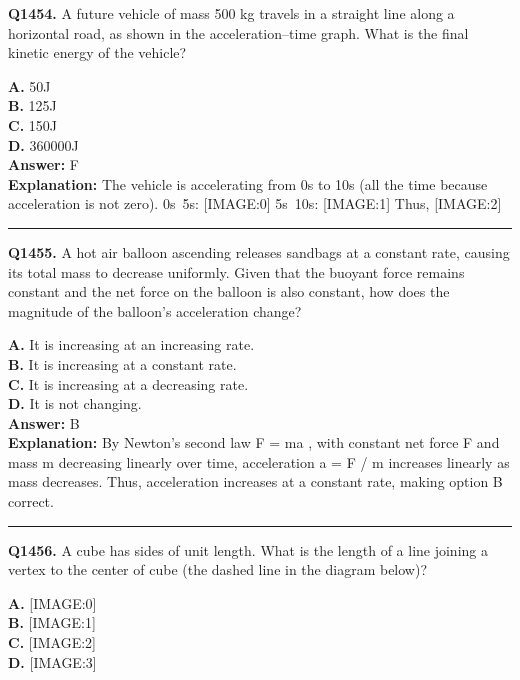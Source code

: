 \documentclass[12pt]{article}
\begin{document}
\noindent
\textbf{Q1454.} A future vehicle of mass 500 kg travels in a straight line along a horizontal road, as shown in the acceleration–time graph.
What is the final kinetic energy of the vehicle?



\textbf{A.} 50J \\
\textbf{B.} 125J \\
\textbf{C.} 150J \\
\textbf{D.} 360000J \\

\textbf{Answer:} F \\
\textbf{Explanation:} The vehicle is accelerating from 0s to 10s (all the time because acceleration is not zero).
0s~5s:
[IMAGE:0]
5s~10s:
[IMAGE:1]
Thus,
[IMAGE:2]

\hrule
\vspace{1em}


\noindent
\textbf{Q1455.} A hot air balloon ascending releases sandbags at a constant rate, causing its total mass to decrease uniformly. Given that the buoyant force remains constant and the net force on the balloon is also constant, how does the magnitude of the balloon’s acceleration change?



\textbf{A.} It is increasing at an increasing rate. \\
\textbf{B.} It is increasing at a constant rate. \\
\textbf{C.} It is increasing at a decreasing rate. \\
\textbf{D.} It is not changing. \\

\textbf{Answer:} B \\
\textbf{Explanation:} By Newton’s second law
F
=
ma
, with constant net force
F
and mass
m
decreasing linearly over time, acceleration
a
=
F
/
m
increases linearly as mass decreases. Thus, acceleration increases at a constant rate, making option B correct.

\hrule
\vspace{1em}


\noindent
\textbf{Q1456.} A cube has sides of unit length. What is the length of a line joining a vertex to the center of cube (the dashed line in the diagram below)?



\textbf{A.} [IMAGE:0] \\
\textbf{B.} [IMAGE:1] \\
\textbf{C.} [IMAGE:2] \\
\textbf{D.} [IMAGE:3] \\
\end{document}
